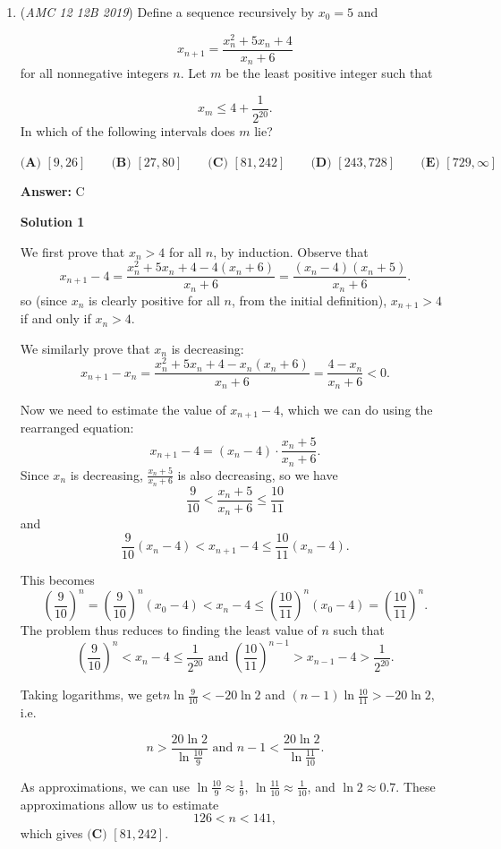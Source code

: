 \begin{enumerate}
 


	\item (\textit{AMC 12 12B 2019}) Define a sequence recursively by $x_0=5$ and

 \[x_{n+1}=\frac{x_n^2+5x_n+4}{x_n+6}\]for all nonnegative integers $n.$ Let $m$ be the least positive integer such that

 \[x_m\leq 4+\frac{1}{2^{20}}.\]In which of the following intervals does $m$ lie?


 $\textbf{(A) } [9,26] \qquad\textbf{(B) } [27,80] \qquad\textbf{(C) } [81,242]\qquad\textbf{(D) } [243,728] \qquad\textbf{(E) } [729,\infty]$

 \textbf{Answer: }C



\textbf{Solution 1}

We first prove that $x_n > 4$ for all $n$, by induction. Observe that
 \[x_{n+1} - 4 = \frac{x_n^2 + 5x_n + 4 - 4(x_n+6)}{x_n+6} = \frac{(x_n - 4)(x_n+5)}{x_n+6}.\]so (since $x_n$ is clearly positive for all $n$, from the initial definition), $x_{n+1} > 4$ if and only if $x_{n} > 4$.

 We similarly prove that $x_n$ is decreasing:
 \[x_{n+1} - x_n = \frac{x_n^2 + 5x_n + 4 - x_n(x_n+6)}{x_n+6} = \frac{4-x_n}{x_n+6} < 0.\]

 Now we need to estimate the value of $x_{n+1}-4$, which we can do using the rearranged equation:
 \[x_{n+1} - 4 = (x_n-4)\cdot\frac{x_n + 5}{x_n+6}.\]Since $x_n$ is decreasing, $\frac{x_n + 5}{x_n+6}$ is also decreasing, so we have
 \[\frac{9}{10} < \frac{x_n + 5}{x_n+6} \le \frac{10}{11}\]and
 \[\frac{9}{10}(x_n-4) < x_{n+1} - 4 \le \frac{10}{11}(x_n-4).\]

 This becomes
 \[\left(\frac{9}{10}\right)^n = \left(\frac{9}{10}\right)^n \left(x_0-4\right) < x_{n} - 4 \le \left(\frac{10}{11}\right)^n \left(x_0-4\right) = \left(\frac{10}{11}\right)^n.\]The problem thus reduces to finding the least value of $n$ such that
 \[\left(\frac{9}{10}\right)^n < x_{n} - 4 \le \frac{1}{2^{20}} \text{  and  }  \left(\frac{10}{11}\right)^{n-1} > x_{n-1} - 4 > \frac{1}{2^{20}}.\]

 Taking logarithms, we get$n \ln \frac{9}{10} < -20 \ln 2$ and $(n-1)\ln \frac{10}{11} > -20 \ln 2$, i.e.

 
 \[n > \frac{20\ln 2}{\ln\frac{10}{9}} \text{  and  }  n-1 < \frac{20\ln 2}{\ln\frac{11}{10}} .\]

 As approximations, we can use $\ln\frac{10}{9} \approx \frac{1}{9}$, $\ln\frac{11}{10} \approx \frac{1}{10}$, and $\ln 2\approx 0.7$. These approximations allow us to estimate
 \[126 < n < 141,\]which gives $\boxed{\textbf{(C) } [81,242]}$.


\end{enumerate}
